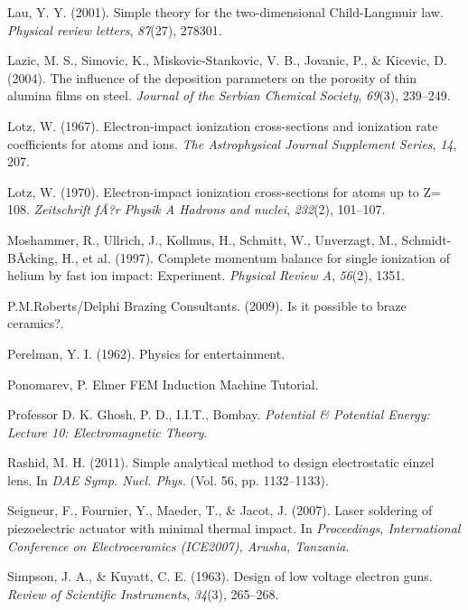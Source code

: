 \documentclass{article}
\begin{document}
\begin{thebibliography}{41}
 Lau, Y. Y. (2001). Simple theory for the two-dimensional Child-Langmuir law. \textit{Physical review letters}, \textit{87}(27), 278301.

 Lazic, M. S., Simovic, K., Miskovic-Stankovic, V. B., Jovanic, P., \& Kicevic, D. (2004). The influence of the deposition parameters on the porosity of thin alumina films on steel. \textit{Journal of the Serbian Chemical Society}, \textit{69}(3), 239--249.

 Lotz, W. (1967). Electron-impact ionization cross-sections and ionization rate coefficients for atoms and ions. \textit{The Astrophysical Journal Supplement Series}, \textit{14}, 207.

 Lotz, W. (1970). Electron-impact ionization cross-sections for atoms up to Z= 108. \textit{Zeitschrift f{\~A}?r Physik A Hadrons and nuclei}, \textit{232}(2), 101--107.

 Moshammer, R., Ullrich, J., Kollmus, H., Schmitt, W., Unverzagt, M., Schmidt-B{\~A}{\textparagraph}cking, H., et al. (1997). Complete momentum balance for single ionization of helium by fast ion impact: Experiment. \textit{Physical Review A}, \textit{56}(2), 1351.

 P.M.Roberts/Delphi Brazing Consultants. (2009). Is it possible to braze ceramics?.

 Perelman, Y. I. (1962). Physics for entertainment.

 Ponomarev, P. Elmer FEM Induction Machine Tutorial.

 Professor D. K. Ghosh, P. D., I.I.T., Bombay. \textit{Potential \& Potential Energy: Lecture 10: Electromagnetic Theory}.

 Rashid, M. H. (2011). Simple analytical method to design electrostatic einzel lens. In \textit{DAE Symp. Nucl. Phys.} (Vol. 56, pp. 1132--1133).

 Seigneur, F., Fournier, Y., Maeder, T., \& Jacot, J. (2007). Laser soldering of piezoelectric actuator with minimal thermal impact. In \textit{Proceedings, International Conference on Electroceramics (ICE2007), Arusha, Tanzania}.

 Simpson, J. A., \& Kuyatt, C. E. (1963). Design of low voltage electron guns. \textit{Review of Scientific Instruments}, \textit{34}(3), 265--268.


\end{thebibliography}
\end{document}
